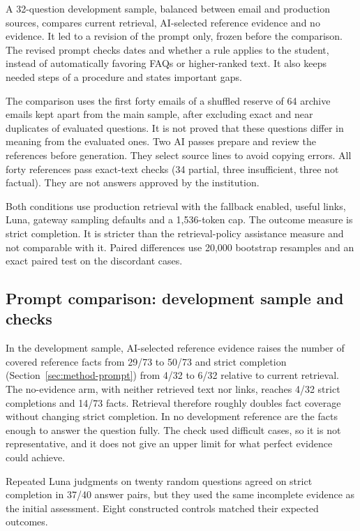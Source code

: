 A 32-question development sample, balanced between email and production sources, compares current retrieval, AI-selected reference evidence and no evidence. It led to a revision of the prompt only, frozen before the comparison. The revised prompt checks dates and whether a rule applies to the student, instead of automatically favoring FAQs or higher-ranked text. It also keeps needed steps of a procedure and states important gaps.

The comparison uses the first forty emails of a shuffled reserve of 64 archive emails kept apart from the main sample, after excluding exact and near duplicates of evaluated questions. It is not proved that these questions differ in meaning from the evaluated ones. Two AI passes prepare and review the references before generation. They select source lines to avoid copying errors. All forty references pass exact-text checks (34 partial, three insufficient, three not factual). They are not answers approved by the institution.

Both conditions use production retrieval with the fallback enabled, useful links, Luna, gateway sampling defaults and a 1,536-token cap. The outcome measure is strict completion. It is stricter than the retrieval-policy assistance measure and not comparable with it. Paired differences use 20,000 bootstrap resamples and an exact paired test on the discordant cases.

\subsection{Prompt comparison: development sample and checks}
\label{sec:prompt-development}

In the development sample, AI-selected reference evidence raises the number of covered reference facts from 29/73 to 50/73 and strict completion (Section~\ref{sec:method-prompt}) from 4/32 to 6/32 relative to current retrieval. The no-evidence arm, with neither retrieved text nor links, reaches 4/32 strict completions and 14/73 facts. Retrieval therefore roughly doubles fact coverage without changing strict completion. In no development reference are the facts enough to answer the question fully. The check used difficult cases, so it is not representative, and it does not give an upper limit for what perfect evidence could achieve.

Repeated Luna judgments on twenty random questions agreed on strict completion in 37/40 answer pairs, but they used the same incomplete evidence as the initial assessment. Eight constructed controls matched their expected outcomes.
